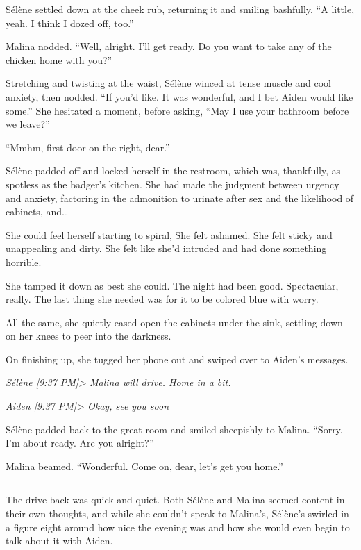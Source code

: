 Sélène settled down at the cheek rub, returning it and smiling bashfully. ``A little, yeah. I think I dozed off, too.''

Malina nodded. ``Well, alright. I'll get ready. Do you want to take any of the chicken home with you?''

Stretching and twisting at the waist, Sélène winced at tense muscle and cool anxiety, then nodded. ``If you'd like. It was wonderful, and I bet Aiden would like some.'' She hesitated a moment, before asking, ``May I use your bathroom before we leave?''

``Mmhm, first door on the right, dear.''

Sélène padded off and locked herself in the restroom, which was, thankfully, as spotless as the badger's kitchen. She had made the judgment between urgency and anxiety, factoring in the admonition to urinate after sex and the likelihood of cabinets, and\ldots{}

She could feel herself starting to spiral, She felt ashamed. She felt sticky and unappealing and dirty. She felt like she'd intruded and had done something horrible.

She tamped it down as best she could. The night had been good. Spectacular, really. The last thing she needed was for it to be colored blue with worry.

All the same, she quietly eased open the cabinets under the sink, settling down on her knees to peer into the darkness.

On finishing up, she tugged her phone out and swiped over to Aiden's messages.

\emph{Sélène {[}9:37 PM{]}\textgreater{} Malina will drive. Home in a bit.}

\emph{Aiden {[}9:37 PM{]}\textgreater{} Okay, see you soon}

Sélène padded back to the great room and smiled sheepishly to Malina. ``Sorry. I'm about ready. Are you alright?''

Malina beamed. ``Wonderful. Come on, dear, let's get you home.''

\begin{center}\rule{0.5\linewidth}{\linethickness}\end{center}

The drive back was quick and quiet. Both Sélène and Malina seemed content in their own thoughts, and while she couldn't speak to Malina's, Sélène's swirled in a figure eight around how nice the evening was and how she would even begin to talk about it with Aiden.

